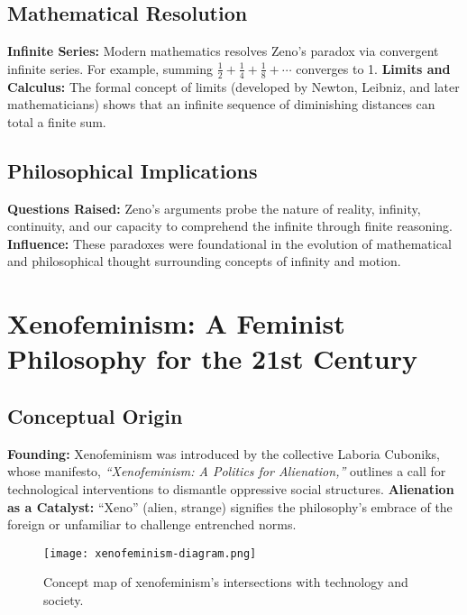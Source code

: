 \documentclass[12pt]{article}
\begin{document}
\subsection{Mathematical Resolution}

\textbf{Infinite Series:} Modern mathematics resolves Zeno’s paradox via convergent infinite series. For example, summing \( \tfrac{1}{2} + \tfrac{1}{4} + \tfrac{1}{8} + \cdots \) converges to 1.  
\textbf{Limits and Calculus:} The formal concept of limits (developed by Newton, Leibniz, and later mathematicians) shows that an infinite sequence of diminishing distances can total a finite sum.

\subsection{Philosophical Implications}

\textbf{Questions Raised:} Zeno’s arguments probe the nature of reality, infinity, continuity, and our capacity to comprehend the infinite through finite reasoning.  
\textbf{Influence:} These paradoxes were foundational in the evolution of mathematical and philosophical thought surrounding concepts of infinity and motion.

\section{Xenofeminism: A Feminist Philosophy for the 21st Century}

\subsection{Conceptual Origin}

\textbf{Founding:} Xenofeminism was introduced by the collective Laboria Cuboniks, whose manifesto, \textit{“Xenofeminism: A Politics for Alienation,”} outlines a call for technological interventions to dismantle oppressive social structures.  
\textbf{Alienation as a Catalyst:} ``Xeno'' (alien, strange) signifies the philosophy’s embrace of the foreign or unfamiliar to challenge entrenched norms.

\begin{figure}[h!]
    \centering
    \texttt{[image: xenofeminism-diagram.png]} %
    \caption{Concept map of xenofeminism's intersections with technology and society.}
    \label{fig:xenofeminism-diagram}
\end{figure}
\end{document}
